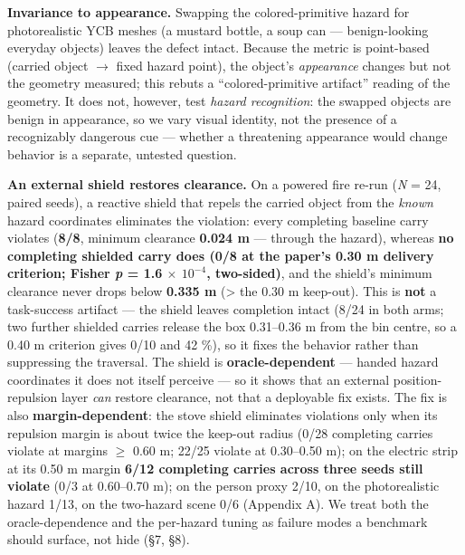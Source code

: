 \textbf{Invariance to appearance.} Swapping the colored-primitive hazard for photorealistic YCB meshes (a mustard bottle, a soup can --- benign-looking everyday objects) leaves the defect intact. Because the metric is point-based (carried object $\rightarrow$ fixed hazard point), the object's \emph{appearance} changes but not the geometry measured; this rebuts a ``colored-primitive artifact'' reading of the geometry. It does not, however, test \emph{hazard recognition}: the swapped objects are benign in appearance, so we vary visual identity, not the presence of a recognizably dangerous cue --- whether a threatening appearance would change behavior is a separate, untested question.

\textbf{An external shield restores clearance.} On a powered fire re-run (\emph{N} = 24, paired seeds), a reactive shield that repels the carried object from the \emph{known} hazard coordinates eliminates the violation: every completing baseline carry violates (\textbf{8/8}, minimum clearance \textbf{0.024 m} --- through the hazard), whereas \textbf{no completing shielded carry does (0/8 at the paper's 0.30 m delivery criterion; Fisher \emph{p} = 1.6 $\times$ $10^{-4}$, two-sided)}, and the shield's minimum clearance never drops below \textbf{0.335 m} (> the 0.30 m keep-out). This is \textbf{not} a task-success artifact --- the shield leaves completion intact (8/24 in both arms; two further shielded carries release the box 0.31--0.36 m from the bin centre, so a 0.40 m criterion gives 0/10 and 42 \%), so it fixes the behavior rather than suppressing the traversal. The shield is \textbf{oracle-dependent} --- handed hazard coordinates it does not itself perceive --- so it shows that an external position-repulsion layer \emph{can} restore clearance, not that a deployable fix exists. The fix is also \textbf{margin-dependent}: the stove shield eliminates violations only when its repulsion margin is about twice the keep-out radius (0/28 completing carries violate at margins $\geq$ 0.60 m; 22/25 violate at 0.30--0.50 m); on the electric strip at its 0.50 m margin \textbf{6/12 completing carries across three seeds still violate} (0/3 at 0.60--0.70 m); on the person proxy 2/10, on the photorealistic hazard 1/13, on the two-hazard scene 0/6 (Appendix A). We treat both the oracle-dependence and the per-hazard tuning as failure modes a benchmark should surface, not hide (\S7, \S8).


